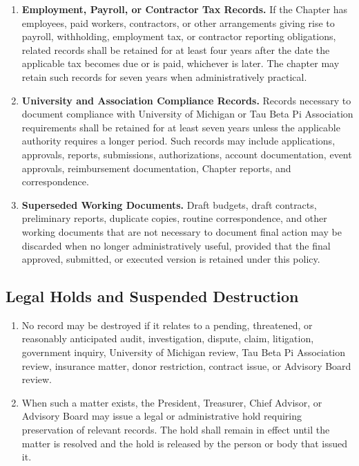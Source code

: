 \begin{enumerate}
    such longer period as the Advisory Board directs.
    \item \textbf{Employment, Payroll, or Contractor Tax Records.} If the Chapter has employees, paid workers, contractors, or other arrangements giving rise to payroll, 
    withholding, employment tax, or contractor reporting obligations, related records shall be retained for at least four years after the date the applicable tax becomes due or is paid, 
    whichever is later. The chapter may retain such records for seven years when administratively practical.
    \item \textbf{University and Association Compliance Records.} Records necessary to document compliance with University of Michigan or Tau Beta Pi Association requirements shall 
    be retained for at least seven years unless the applicable authority requires a longer period. Such records may include applications, approvals, reports, submissions, 
    authorizations, account documentation, event approvals, reimbursement documentation, Chapter reports, and correspondence.
    \item \textbf{Superseded Working Documents.} Draft budgets, draft contracts, preliminary reports, duplicate copies, routine correspondence, and other working documents that are 
    not necessary to document final action may be discarded when no longer administratively useful, provided that the final approved, submitted, 
    or executed version is retained under this policy.
\end{enumerate}

\subsection{Legal Holds and Suspended Destruction} \label{XII.7}
\begin{enumerate}
    \item {} No record may be destroyed if it relates to a pending, threatened, or reasonably anticipated audit, investigation, dispute, claim, 
    litigation, government inquiry, University of Michigan review, Tau Beta Pi Association review, insurance matter, donor restriction, contract issue, or Advisory Board review.
    \item {} When such a matter exists, the President, Treasurer, Chief Advisor, or Advisory Board may issue a legal or administrative hold requiring 
    preservation of relevant records. The hold shall remain in effect until the matter is resolved and the hold is released by the person or body that issued it.
\end{enumerate}

